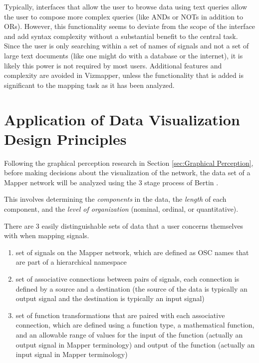 Typically, interfaces that allow the user to browse data using text queries allow the user to compose more complex queries (like ANDs or NOTs in addition to ORs). However, this functionality seems to deviate from the scope of the interface and add syntax complexity without a substantial benefit to the central task. Since the user is only searching within a set of names of signals and not a set of large text documents (like one might do with a database or the internet), it is likely this power is not required by most users. Additional features and complexity are avoided in Vizmapper, unless the functionality that is added is significant to the mapping task as it has been analyzed.

\section{Application of Data Visualization Design Principles}

Following the graphical perception research in Section \ref{sec:Graphical Perception}, before making decisions about the visualization of the network, the data set of a Mapper network will be analyzed using the 3 stage process of Bertin \cite{semiology1983}.

This involves determining the \emph{components} in the data, the \emph{length} of each component, and the \emph{level of organization} (nominal, ordinal, or quantitative).

There are 3 easily distinguishable sets of data that a user concerns themselves with when mapping signals.

\begin{enumerate}
\item set of signals on the Mapper network, which are defined as OSC names that are part of a hierarchical namespace
\item set of associative connections between pairs of signals, each connection is defined by a source and a destination (the source of the data is typically an output signal and the destination is typically an input signal)
\item set of function transformations that are paired with each associative connection, which are defined using a function type, a mathematical function, and an allowable range of values for the input of the function (actually an output signal in Mapper terminology) and output of the function (actually an input signal in Mapper terminology)
\end{enumerate}

